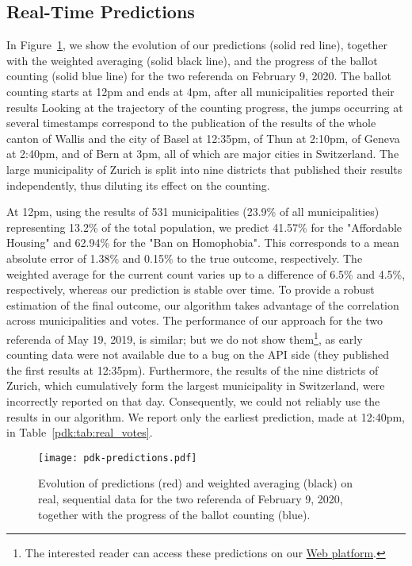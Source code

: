 \subsection{Real-Time Predictions}

In Figure~\ref{pdk:fig:predictions}, we show the evolution of our predictions (solid red line), together with the weighted averaging (solid black line), and the progress of the ballot counting (solid blue line) for the two referenda on February 9, 2020.
The ballot counting starts at 12pm and ends at 4pm, after all municipalities reported their results
Looking at the trajectory of the counting progress, the jumps occurring at several timestamps correspond to the publication of the results of the whole canton of Wallis and the city of Basel at 12:35pm, of Thun at 2:10pm, of Geneva at 2:40pm, and of Bern at 3pm, all of which are major cities in Switzerland.
The large municipality of Zurich is split into nine districts that published their results independently, thus diluting its effect on the counting.

At 12pm, using the results of 531 municipalities (23.9\% of all municipalities) representing 13.2\% of the total population, we predict 41.57\% for the "Affordable Housing" and 62.94\% for the "Ban on Homophobia".
This corresponds to a mean absolute error of 1.38\% and 0.15\% to the true outcome, respectively.
The weighted average for the current count varies up to a difference of 6.5\% and 4.5\%, respectively, whereas our prediction is stable over time.
To provide a robust estimation of the final outcome, our algorithm takes advantage of the correlation across municipalities and votes.
The performance of our approach for the two referenda of May 19, 2019, is similar; but we do not show them\footnote{The interested reader can access these predictions on our \href{http://www.predikon.ch}{Web platform}.}, as early counting data were not available due to a bug on the API side (they published the first results at 12:35pm).
Furthermore, the results of the nine districts of Zurich, which cumulatively form the largest municipality in Switzerland, were incorrectly reported on that day.
Consequently, we could not reliably use the results in our algorithm.
We report only the earliest prediction, made at 12:40pm, in Table~\ref{pdk:tab:real_votes}.

\begin{figure}
	\texttt{[image: pdk-predictions.pdf]}
	\caption{
		Evolution of predictions (red) and weighted averaging (black) on real, sequential data for the two referenda of February 9, 2020, together with the progress of the ballot counting (blue).
	}
	\label{pdk:fig:predictions}
\end{figure}
